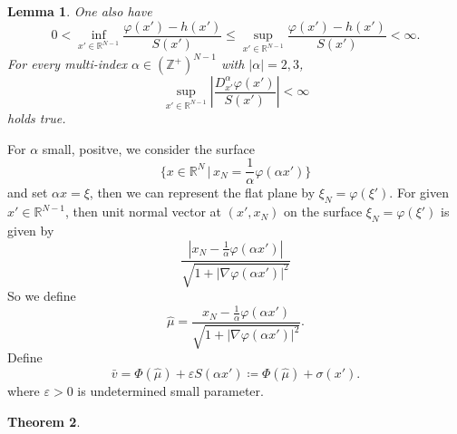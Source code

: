 \documentclass[12pt, a4paper]{article}
\newtheorem{thm}{Theorem}[section]
\newtheorem{lemma}[thm]{Lemma}
\numberwithin{equation}{section}
\newcommand{\R}{\mathbb{R}}
\newcommand{\Z}{\mathbb{Z}}
\newcommand{\hmu}{\hat{\mu}}
\begin{document}
\begin{CJK}{UTF8}{bkai}
\begin{lemma}\cite[Proposition 2.3]{KT2011}\label{lem2.5}
	One also have
\[
	0<\inf_{x'\in\R^{N-1}}\frac{\varphi(x')-h(x')}{S(x')}\leq\sup_{x'\in\R^{N-1}}\frac{\varphi(x')-h(x')}{S(x')}<\infty.
\]
For every multi-index $\alpha\in(\Z^+)^{N-1}$ with $|\alpha|=2,3$,
\[
	\sup_{x'\in\R^{N-1}}\left|\frac{D^\alpha_{x'}\varphi(x')}{S(x')}\right|<\infty
\]
holds true.
\end{lemma}

For $\alpha$ small, positve, we consider the surface
\begin{equation}
	\{x\in\R^N\,|\,x_N=\frac{1}{\alpha}\varphi(\alpha x')\}
\end{equation}
and set $\alpha x=\xi$, then we can represent the flat plane by $\xi_N=\varphi(\xi')$. For given $x'\in\R^{N-1}$, then unit normal vector at $(x',x_N)$ on the surface $\xi_N=\varphi(\xi')$ is given by
\[
	\frac{|x_N-\frac{1}{\alpha}\varphi(\alpha x')|}{\sqrt{1+|\nabla\varphi(\alpha x')|^2}}
\]
So we define
\begin{equation}\label{iden2.15}
	\hmu=\frac{x_N-\frac{1}{\alpha}\varphi(\alpha x')}{\sqrt{1+|\nabla\varphi(\alpha x')|^2}}.
\end{equation}
Define 
\begin{equation}\label{iden2.16}
	\bar{v}=\Phi(\hat{\mu})+\varepsilon S(\alpha x')\coloneqq \Phi(\hmu)+\sigma(x').
\end{equation}
where $\varepsilon>0$ is undetermined small parameter. 



\begin{thm}\cite[Lemma 4.1]{KT2011}\label{thm2.6}
	

\end{thm}
\end{CJK}
\end{document}
